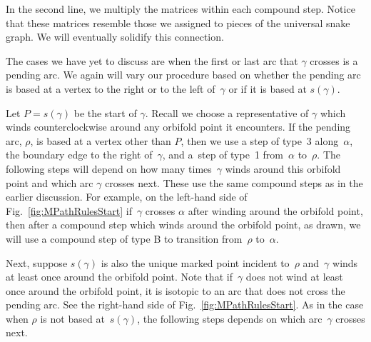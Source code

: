 \documentclass[11pt]{article}
\numberwithin{equation}{section}
\begin{document}
\begin{Example}
In the second line, we multiply the matrices within each compound step. Notice that these matrices resemble those we assigned to pieces of the universal snake graph. We will eventually solidify this connection.
\end{Example}

The cases we have yet to discuss are when the first or last arc that $\gamma$ crosses is a pending arc. We again will vary our procedure based on whether the pending arc is based at a vertex to the right or to the left of~$\gamma$ or if it is based at $s(\gamma)$.

Let $P = s(\gamma)$ be the start of $\gamma$. Recall we choose a representative of $\gamma$ which winds counterclockwise around any orbifold point it encounters. If the pending arc, $\rho$, is based at a vertex other than $P$, then we use a step of type~3 along~$\alpha$, the boundary edge to the right of~$\gamma$, and a~step of type~1 from~$\alpha$ to~$\rho$.
The following steps will depend on how many times~$\gamma$ winds around this orbifold point and which arc $\gamma$ crosses next. These use the same compound steps as in the earlier discussion. For example, on the left-hand side of Fig.~\ref{fig:MPathRulesStart} if~$\gamma$ crosses $\alpha$ after winding around the orbifold point, then after a compound step which winds around the orbifold point, as drawn, we will use a compound step of type B to transition from~$\rho$ to~$\alpha$.

Next, suppose $s(\gamma)$ is also the unique marked point incident to~$\rho$ and~$\gamma$ winds at least once around the orbifold point. Note that if~$\gamma$ does not wind at least once around the orbifold point, it is isotopic to an arc that does not cross the pending arc. See the right-hand side of Fig.~\ref{fig:MPathRulesStart}.
As in the case when $\rho$ is not based at~$s(\gamma)$, the following steps depends on which arc~$\gamma$ crosses next.
\end{document}
